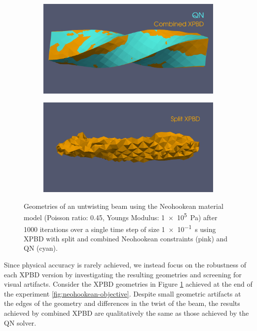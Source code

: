 \begin{figure}[t]
    \centering
    \begin{subfigure}{0.49\textwidth}
        \includegraphics[width=\textwidth, trim={0 5.0cm 0 1.0cm}, clip]{figures/neohookean_xpbd_ok.png}
    \end{subfigure}
    \hspace{0.001\textwidth}
    \begin{subfigure}{0.49\textwidth}
        \includegraphics[width=\textwidth, trim={0 5.0cm 0 1.0cm}, clip]{figures/neohookean_xpbd_bad.png}
    \end{subfigure}
    \caption{Geometries of an untwisting beam using the Neohookean material model (Poisson ratio: 0.45, Youngs Modulus: \SI{1e5}{\pascal}) after 1000 iterations over a single 
        time step of size \SI{1e-1}{\second} using XPBD with split and combined Neohookean constraints (pink) and QN (cyan).}
    \label{fig:neohookean-geometries}
\end{figure}

Since physical accuracy is rarely achieved, we instead focus on the robustness of each XPBD version by investigating the resulting geometries and screening for 
visual artifacts. Consider the XPBD geometries in Figure \ref{fig:neohookean-geometries} achieved at the end of the experiment
\ref{fig:neohookean-objective}. Despite small geometric artifacts at the edges of the geometry and differences in the twist of the beam, the 
results achieved by combined XPBD are qualitatively the same as those achieved by the QN solver. 

